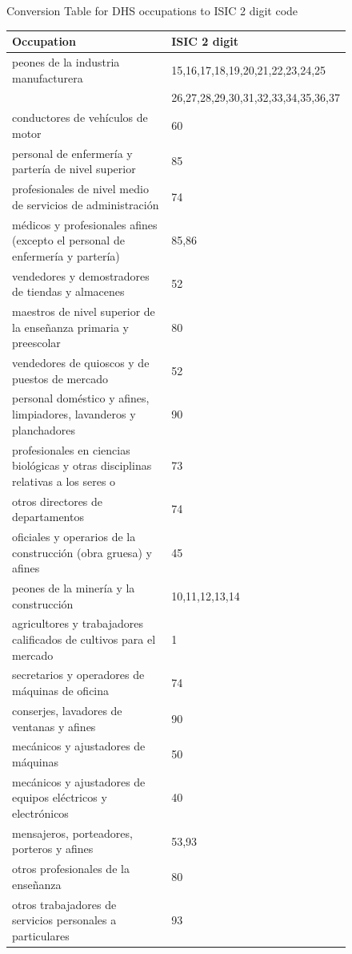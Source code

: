 \documentclass[12pt]{article}
\begin{document}
\begin{figure}[H]
\begin{center}
Conversion Table for DHS occupations to ISIC 2 digit code
\scriptsize
\begin{tabular}{ll}
Occupation & ISIC 2 digit\\ \hline
peones de la industria manufacturera & 15,16,17,18,19,20,21,22,23,24,25\\
&26,27,28,29,30,31,32,33,34,35,36,37\\
conductores de veh\'{i}culos de motor & 60\\
personal de enfermer\'{i}a y parter\'{i}a de nivel superior & 85\\
profesionales de nivel medio de servicios de administraci\'{o}n & 74\\
m\'{e}dicos y profesionales afines (excepto el personal de enfermer\'{i}a y parter\'{i}a) & 85,86\\
vendedores y demostradores de tiendas y almacenes & 52\\
maestros de nivel superior de la ense\~{n}anza primaria y preescolar & 80\\
vendedores de quioscos y de puestos de mercado & 52\\
personal dom\'{e}stico y afines, limpiadores, lavanderos y planchadores & 90\\
profesionales en ciencias biol\'{o}gicas y otras disciplinas relativas a los seres o & 73\\
otros directores de departamentos & 74\\
oficiales y operarios de la construcci\'{o}n (obra gruesa) y afines & 45\\
peones de la miner\'{i}a y la construcci\'{o}n & 10,11,12,13,14\\
agricultores y trabajadores calificados de cultivos para el mercado & 1\\
secretarios y operadores de m\'{a}quinas de oficina & 74\\
conserjes, lavadores de ventanas y afines & 90\\
mec\'{a}nicos y ajustadores de m\'{a}quinas & 50\\
mec\'{a}nicos y ajustadores de equipos el\'{e}ctricos y electr\'{o}nicos & 40\\
mensajeros, porteadores, porteros y afines & 53,93\\
otros profesionales de la ense\~{n}anza & 80\\
otros trabajadores de servicios personales a particulares & 93\\

\end{tabular}
\end{center}
\end{figure}
\end{document}
